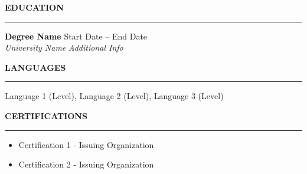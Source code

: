 \documentclass[11pt,a4paper]{article}
\newcommand{\resumeSection}[1]{
  \vspace{2mm}
  {\large\textbf{#1}}
  \vspace{1mm}
  \hrule
  \vspace{1mm}
}
\newcommand{\roleHeader}[4]{
  \textbf{#1} \hfill #2 \\
  \textit{#3} \hfill \textit{#4}
}
\begin{document}
\resumeSection{EDUCATION}
\roleHeader{Degree Name}{Start Date -- End Date}{University Name}{Additional Info}

\resumeSection{LANGUAGES}
Language 1 (Level), Language 2 (Level), Language 3 (Level)

\resumeSection{CERTIFICATIONS}
\begin{itemize}[nosep,leftmargin=*]
  \item Certification 1 - Issuing Organization
  \item Certification 2 - Issuing Organization
\end{itemize}
\end{document}
